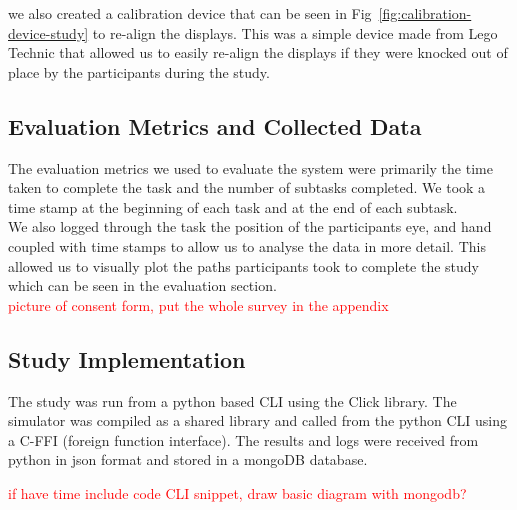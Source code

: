 we also created a calibration device that can be seen in Fig~\ref{fig:calibration-device-study} to re-align the displays. This was a simple device made from Lego Technic \tocite that allowed us to easily re-align the displays if they were knocked out of place by the participants during the study.

\subsection{Evaluation Metrics and Collected Data}
The evaluation metrics we used to evaluate the system were primarily the time taken to complete the task and the number of subtasks completed. We took a time stamp at the beginning of each task and at the end of each subtask. \\

We also logged through the task the position of the participants eye, and hand coupled with time stamps to allow us to analyse the data in more detail. This allowed us to visually plot the paths participants took to complete the study which can be seen in the evaluation section. \\

\textcolor{red}{picture of consent form, put the whole survey in the appendix}

\subsection{Study Implementation}

The study was run from a python based CLI using the Click library. The simulator was compiled as a shared library and called from the python CLI using a C-FFI (foreign function interface). The results and logs were received from python in json format and stored in a mongoDB database.

\textcolor{red}{if have time include code CLI snippet, draw basic diagram with mongodb?}
